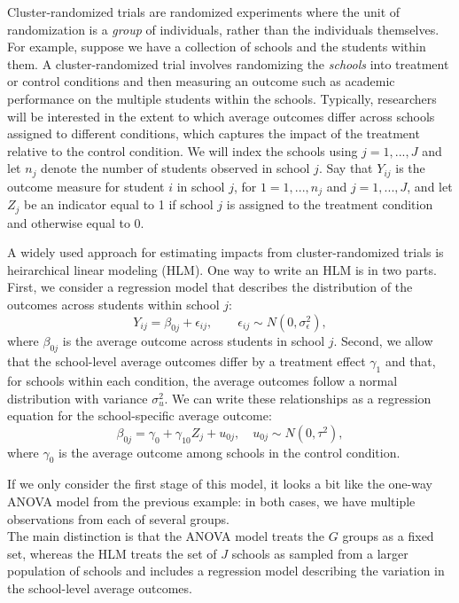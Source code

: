 \documentclass[
]{book}
\begin{document}
Cluster-randomized trials are randomized experiments where the unit of randomization is a \emph{group} of individuals, rather than the individuals themselves.
For example, suppose we have a collection of schools and the students within them.
A cluster-randomized trial involves randomizing the \emph{schools} into treatment or control conditions and then measuring an outcome such as academic performance on the multiple students within the schools.
Typically, researchers will be interested in the extent to which average outcomes differ across schools assigned to different conditions, which captures the impact of the treatment relative to the control condition.
We will index the schools using \(j = 1,...,J\) and let \(n_j\) denote the number of students observed in school \(j\).
Say that \(Y_{ij}\) is the outcome measure for student \(i\) in school \(j\), for \(1 = 1,...,n_j\) and \(j = 1,...,J\), and let \(Z_j\) be an indicator equal to 1 if school \(j\) is assigned to the treatment condition and otherwise equal to 0.

A widely used approach for estimating impacts from cluster-randomized trials is heirarchical linear modeling (HLM).
One way to write an HLM is in two parts.
First, we consider a regression model that describes the distribution of the outcomes across students within school \(j\):
\[
Y_{ij} = \beta_{0j} + \epsilon_{ij}, \qquad \epsilon_{ij} \sim N(0, \sigma_{\epsilon}^2),
\]
where \(\beta_{0j}\) is the average outcome across students in school \(j\).
Second, we allow that the school-level average outcomes differ by a treatment effect \(\gamma_{1}\) and that, for schools within each condition, the average outcomes follow a normal distribution with variance \(\sigma_u^2\).
We can write these relationships as a regression equation for the school-specific average outcome:
\[
\beta_{0j} = \gamma_{0} + \gamma_{10} Z_j + u_{0j}, \quad u_{0j} \sim N(0, \tau^2),
\]
where \(\gamma_{0}\) is the average outcome among schools in the control condition.

If we only consider the first stage of this model, it looks a bit like the one-way ANOVA model from the previous example:
in both cases, we have multiple observations from each of several groups.\\
The main distinction is that the ANOVA model treats the \(G\) groups as a fixed set, whereas the HLM treats the set of \(J\) schools as sampled from a larger population of schools and includes a regression model describing the variation in the school-level average outcomes.
\end{document}

